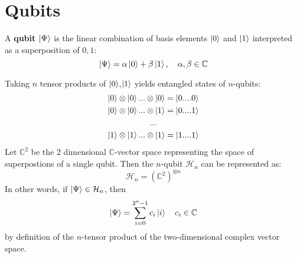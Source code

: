\documentclass{../quantum.tex}
\begin{document}
\section{Qubits}

A {\bf qubit} $\ket{\Psi}$ is the linear combination of basis elements $\ket{0}$ and $\ket{1}$ interpreted as a superposition of $0,1$:
$$ \ket{\Psi} = \alpha \ket{0} + \beta \ket{1}, \quad \alpha,\beta \in \mathbb{C}$$

Taking $n$ tensor products of $\ket{0}$,$\ket{1}$ yields entangled states of $n$-qubits:
\begin{gather*}
  \ket{0} \otimes \ket{0} ... \otimes \ket{0} = \ket{0....0} \\   \ket{0} \otimes \ket{0} ... \otimes \ket{1} = \ket{0....1} \\
  ... \\
    \ket{1} \otimes \ket{1} ... \otimes \ket{1} = \ket{1....1}
\end{gather*}
Let $\mathbb{C}^2$ be the 2 dimensional $\mathbb{C}$-vector space representing the space of superpostions of a single qubit. Then the $n$-qubit $\mathcal{H}_n$ can be represented as:
$$\mathcal{H}_n = (\mathbb{C}^2)^{\otimes n}  $$ In other words, if $\ket{\Psi} \in \mathcal{H}_n$, then
$$ \ket{\Psi} = \sum_{i= 0}^{2^n -1} c_i \ket{i} \quad c_i \in \mathbb{C} $$
by definition of the $n$-tensor product of the two-dimensional complex vector space.
\end{document}
